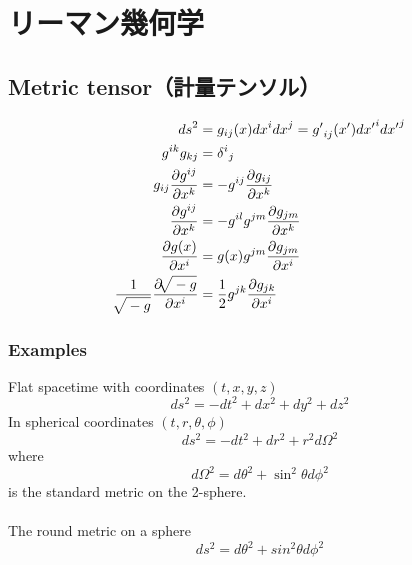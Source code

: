 \section{リーマン幾何学}


%
%
\subsection{Metric tensor（計量テンソル）}
\begin{align}
  {ds}^2
    & = g_{ij}(x) {dx}^{i} {dx}^{j} = {g'}_{ij}(x') {dx'}^{i} {dx'}^{j} \\
  g^{ik} g_{kj}
    & = {{\delta }^i}_j \\
  g_{ij} \frac{\partial g^{ij}}{\partial x^k}
    & = -g^{ij} \frac{\partial g_{ij}}{\partial x^k} \\
  \frac{\partial g^{ij}}{\partial x^k}
    & = - g^{il} g^{jm} \frac{\partial g_{jm}}{\partial x^k} \\
  \frac{\partial g(x)}{\partial x^i}
    & = g(x) g^{jm} \frac{\partial g_{jm}}{\partial x^i} \\
  \frac{1}{\sqrt[]{\mathstrut -g}} \frac{\partial \sqrt[]{\mathstrut -g}}{\partial x^i}
    & = \frac{1}{2} g^{jk} \frac{\partial g_{jk}}{\partial x^i}
\end{align}


\subsubsection{Examples}
Flat spacetime with coordinates $ (t, x, y, z) $
\begin{equation}
  ds^2 = -dt^2 +dx^2 + dy^2 + dz^2
\end{equation}
In spherical coordinates $ (t, r, \theta, \phi) $
\begin{equation}
  ds^2 = -dt^2 + dr^2 + r^2d\Omega^2
\end{equation}
where
\begin{equation}
  d\Omega^2 = d\theta^2 + \sin^2 \theta d\phi^2
\end{equation}
is the standard metric on the 2-sphere.\\
\\
The round metric on a sphere
\begin{equation}
  ds^2 = d{\theta }^2 + sin^2\theta d\phi^2
\end{equation}


